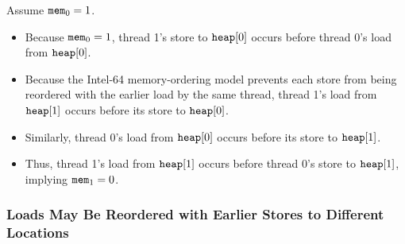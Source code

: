 \begin{table}[!hbt]
\noindent{}
\caption{Stores Are Not Reordered with Older Loads \cite[Example 8-2]{ref:Intel}}
\label{tbl:litmus:intel:2}
\end{table}

\noindent
Assume $\texttt{mem}_0 = 1$.
\begin{itemize}
  \item Because $\texttt{mem}_0 = 1$, thread 1’s store to $\texttt{heap}[0]$ occurs before thread 0’s load from $\texttt{heap}[0]$.
  \item Because the Intel-64 memory-ordering model prevents each store from being reordered with the earlier load by the same thread, thread 1’s load from $\texttt{heap}[1]$ occurs before its store to $\texttt{heap}[0]$.
  \item Similarly, thread 0’s load from $\texttt{heap}[0]$ occurs before its store to $\texttt{heap}[1]$.
  \item Thus, thread 1’s load from $\texttt{heap}[1]$ occurs before thread 0’s store to $\texttt{heap}[1]$, implying $\texttt{mem}_1 = 0$.
\end{itemize}

\newpage

\subsubsection*{Loads May Be Reordered with Earlier Stores to Different Locations}

